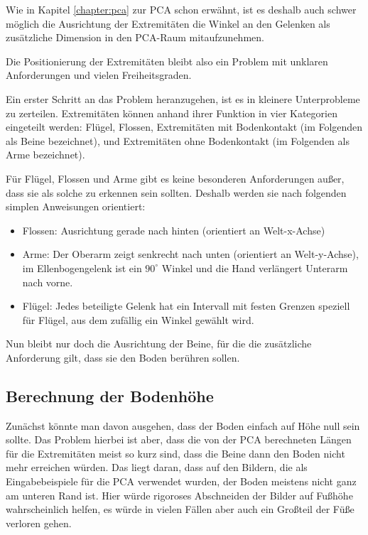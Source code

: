 Wie in Kapitel \ref{chapter:pca} zur PCA schon erwähnt, ist es deshalb auch schwer möglich die Ausrichtung der Extremitäten \bzw die Winkel an den Gelenken als zusätzliche Dimension in den PCA-Raum mitaufzunehmen.

Die Positionierung der Extremitäten bleibt also ein Problem mit unklaren Anforderungen und vielen Freiheitsgraden.

Ein erster Schritt an das Problem heranzugehen, ist es in kleinere Unterprobleme zu zerteilen.
Extremitäten können anhand ihrer Funktion in vier Kategorien eingeteilt werden:
Flügel, Flossen, Extremitäten mit Bodenkontakt (im Folgenden als Beine bezeichnet), und Extremitäten ohne Bodenkontakt (im Folgenden als Arme bezeichnet).

Für Flügel, Flossen und Arme gibt es keine besonderen Anforderungen außer, dass sie als solche zu erkennen sein sollten. Deshalb werden sie nach folgenden simplen Anweisungen orientiert:
\begin{itemize}
 \item Flossen: Ausrichtung gerade nach hinten (orientiert an Welt-x-Achse)
 \item Arme: Der Oberarm zeigt senkrecht nach unten (orientiert an Welt-y-Achse), im Ellenbogengelenk ist ein $90^{\circ}$ Winkel und die Hand verlängert Unterarm nach vorne.
 \item Flügel: Jedes beteiligte Gelenk hat ein Intervall mit festen Grenzen speziell für Flügel, aus dem zufällig ein Winkel gewählt wird.
\end{itemize}

Nun bleibt nur doch die Ausrichtung der Beine, für die die zusätzliche Anforderung gilt, dass sie den Boden berühren sollen.


\subsection{Berechnung der Bodenhöhe}
\label{floor_height}

Zunächst könnte man davon ausgehen, dass der Boden einfach auf Höhe null sein sollte. Das Problem hierbei ist aber, dass die von der PCA berechneten Längen für die Extremitäten meist so kurz sind, dass die Beine dann den Boden nicht mehr erreichen würden. Das liegt daran, dass auf den Bildern, die als Eingabebeispiele für die PCA verwendet wurden, der Boden meistens nicht ganz am unteren Rand ist. Hier würde rigoroses Abschneiden der Bilder auf Fußhöhe wahrscheinlich helfen, es würde in vielen Fällen aber auch ein Großteil der Füße verloren gehen.

